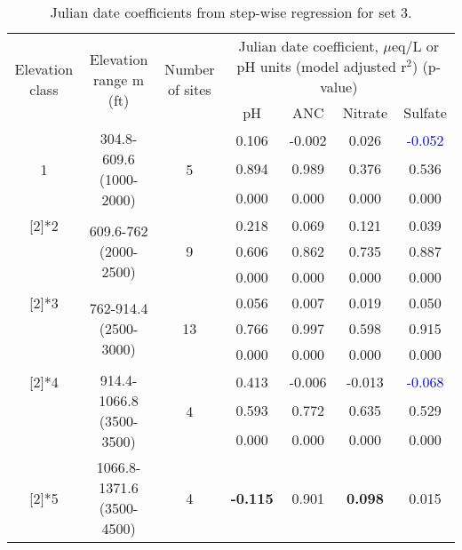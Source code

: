 \begin{table}\tiny
  \centering
  \caption{Julian date coefficients from step-wise regression for set 3.}
    \begin{tabular}{ccccccc}
    \toprule
    \multirow{3}[4]{1cm}{Elevation class} & \multirow{3}[4]{1cm}{Elevation range m (ft)} & \multirow{3}[4]{1cm}{Number of sites} & \multicolumn{4}{c}{\multirow{2}[2]{4cm}{Julian date coefficient, $\mu$eq/L or pH units (model adjusted r$^2$) (p-value)}} \\
          &       &       & \multicolumn{4}{c}{} \bigstrut\\\cline{4-7}\noalign{\smallskip}
          &       &       & pH    & ANC   & Nitrate & Sulfate \\
\midrule
    \multirow{3}[2]{*}{1} & \multirow{3}[2]{2.5cm}{304.8-609.6 (1000-2000)} & \multirow{3}[2]{*}{5} & 0.106  & -0.002  & 0.026  & \textcolor{blue}{-0.052}  \\
          &       &       & 0.894  & 0.989  & 0.376  & 0.536  \\
          &       &       & 0.000  & 0.000  & 0.000  & 0.000 \bigstrut\\\cline{4-7}\noalign{\smallskip}
    \multirow{3}[2]{*}{2} & \multirow{3}[2]{2.5cm}{609.6-762 (2000-2500)} & \multirow{3}[2]{*}{9} & 0.218  & 0.069  & 0.121  & 0.039  \\
          &       &       & 0.606  & 0.862  & 0.735  & 0.887  \\
          &       &       & 0.000  & 0.000  & 0.000  & 0.000 \bigstrut\\\cline{4-7}\noalign{\smallskip}
    \multirow{3}[2]{*}{3} & \multirow{3}[2]{2.5cm}{762-914.4 (2500-3000)} & \multirow{3}[2]{*}{13} & 0.056  & 0.007  & 0.019  & 0.050  \\
          &       &       & 0.766  & 0.997  & 0.598  & 0.915  \\
          &       &       & 0.000  & 0.000  & 0.000  & 0.000  \bigstrut\\\cline{4-7}\noalign{\smallskip}
    \multirow{3}[2]{*}{4} & \multirow{3}[2]{2.5cm}{914.4-1066.8 (3500-3500)} & \multirow{3}[2]{*}{4} & 0.413  & -0.006  & -0.013  & \textcolor{blue}{-0.068}  \\
          &       &       & 0.593  & 0.772  & 0.635  & 0.529  \\
          &       &       & 0.000  & 0.000  & 0.000  & 0.000  \bigstrut\\\cline{4-7}\noalign{\smallskip}
    \multirow{3}[2]{*}{5} & \multirow{3}[2]{2.5cm}{1066.8-1371.6 (3500-4500)} & \multirow{3}[2]{*}{4} & \textbf{-0.115 } & 0.901  & \textbf{0.098 } & 0.015  \\

\end{tabular}
\end{table}
